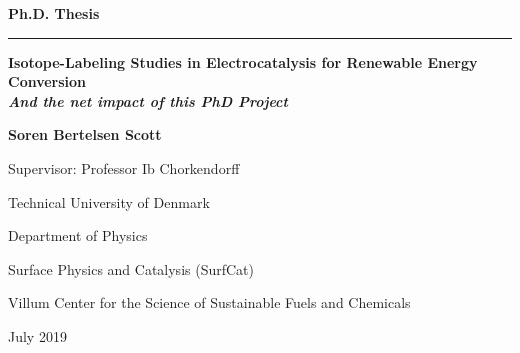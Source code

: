 
\begin{titlepage}



\begin{center}
\parindent=0pt
\flushleft

\newcommand{\HRule}{\rule{\textwidth}{1mm}}

\Large{\textbf{Ph.D. Thesis}}

\HRule

\vspace{3mm}
\LARGE{\textbf{Isotope-Labeling Studies in Electrocatalysis for Renewable Energy Conversion}}\\

\vspace{3mm}
\large{\textit{\textbf{And the net  impact of this PhD Project}}}


\end{center}

\vfill


\noindent
\parindent=0pt
\Large{\textbf{Soren Bertelsen Scott}}

\vspace{5mm}

Supervisor: Professor Ib Chorkendorff

Technical University of Denmark

Department of Physics

Surface Physics and Catalysis (SurfCat)

Villum Center for the Science of Sustainable Fuels and Chemicals

\vspace{5mm}

July 2019
\end{titlepage}
